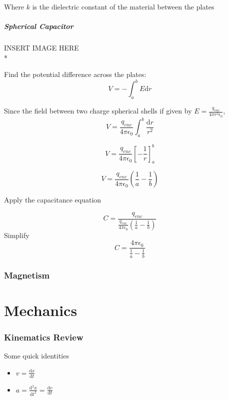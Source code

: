 \documentclass[a4paper,12pt]{article}
\begin{document}
				Where $k$ is the dielectric constant of the material between the plates
			\subsubsection{Spherical Capacitor}
				INSERT IMAGE HERE\\*
				
				Find the potential difference across the plates:
				\begin{equation*}
						V = -\int_{a}^{b} E\mathrm{d}r
				\end{equation*}

				Since the field between two charge spherical shells if given by $E = \frac{q_{enc}}{4 \pi r^{2}\epsilon_{0}}$, 
				\begin{equation*}
						V = \frac{q_{enc}}{4 \pi \epsilon_{0}} \int_{a}^{b} \frac{\mathrm{d}r}{r^{2}}
				\end{equation*}

				\begin{equation*}
						V = \frac{q_{enc}}{4 \pi \epsilon_{0}} \left[ -\frac{1}{r} \right]_{a}^{b}
				\end{equation*}

				\begin{equation*}
						V =  \frac{q_{enc}}{4 \pi \epsilon_{0}} \left(\frac{1}{a} - \frac{1}{b}\right) 
				\end{equation*}

				Apply the capacitance equation

				\begin{equation*}
						C = \frac{q_{enc}}{\frac{q_{enc}}{4 \pi \epsilon_{0}} \left(\frac{1}{a} - \frac{1}{b}\right)} 
				\end{equation*}
				Simplify
				\begin{equation*}
						C = \frac{4\pi \epsilon_{0}}{\frac{1}{a} - \frac{1}{b}}	
				\end{equation*}

	\section{Magnetism}

\newpage
\part{Mechanics}
		\section{Kinematics Review}
		Some quick identities
		\begin{itemize}
				\item $v = \frac{\mathrm{d}x}{\mathrm{d}t}$
				\item $a = \frac{\mathrm{d}^{2}x}{\mathrm{d}t^{2}} = \frac{\mathrm{d}v}{\mathrm{d}t}$
		\end{itemize}
\end{document}

